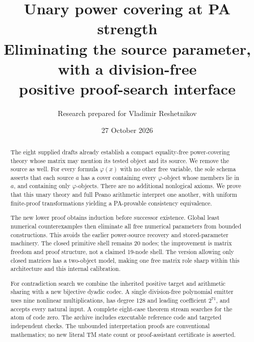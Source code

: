 \documentclass[11pt,letterpaper]{article}
\title{\color{ink}Unary power covering at PA strength\\[6pt]
\large Eliminating the source parameter, with a division-free\\positive proof-search interface}
\author{Research prepared for Vladimir Reshetnikov}
\date{27 October 2026}
\theoremstyle{definition}
\begin{document}
\maketitle
\begin{abstract}
The eight supplied drafts already establish a compact equality-free power-covering theory whose matrix may mention its tested object and its source. We remove the source as well. For every formula $\varphi(x)$ with no other free variable, the sole schema asserts that each source $a$ has a cover containing every $\varphi$-object whose members lie in $a$, and containing only $\varphi$-objects. There are no additional nonlogical axioms. We prove that this unary theory and full Peano arithmetic interpret one another, with uniform finite-proof transformations yielding a PA-provable consistency equivalence.

The new lower proof obtains induction before successor existence. Global least numerical counterexamples then eliminate all free numerical parameters from bounded constructions. This avoids the earlier power-source recovery and stored-parameter machinery. The closed primitive shell remains 20 nodes; the improvement is matrix freedom and proof structure, not a claimed 19-node shell. The version allowing only closed matrices has a two-object model, making one free matrix role sharp within this architecture and this internal calibration.

For contradiction search we combine the inherited positive target and arithmetic sharing with a new bijective dyadic codec. A single division-free polynomial emitter uses nine nonlinear multiplications, has degree 128 and leading coefficient $2^{71}$, and accepts every natural input. A complete eight-case theorem stream searches for the atom of code zero. The archive includes executable reference code and targeted independent checks. The unbounded interpretation proofs are conventional mathematics; no new literal TM state count or proof-assistant certificate is asserted.
\end{abstract}
\clearpage
\tableofcontents
\clearpage










\end{document}
